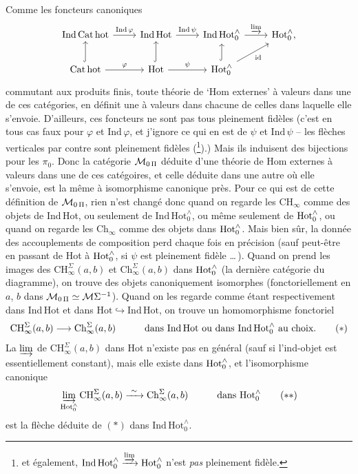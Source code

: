 Comme les foncteurs canoniques
\[
\begin{tikzcd}
\mathrm{Ind\,Cat\,hot} \arrow[r, "\mathrm{Ind}\,\varphi"] & \mathrm{Ind\,Hot} \arrow[r, "\mathrm{Ind}\,\psi"] & \mathrm{Ind\,Hot}_0^{\wedge} \arrow[r, "\varinjlim"] & \mathrm{Hot}_0^{\wedge},\\
\mathrm{Cat\,hot} \arrow[u, hook] \arrow[r, "\varphi"] & \mathrm{Hot} \arrow[u, hook] \arrow[r, "\psi"] & \mathrm{Hot}_0^{\wedge} \arrow[u, hook] \arrow[ur, "\mathrm{id}"'] &
\end{tikzcd}
\]
commutant aux produits finis, toute théorie de `Hom externes' à valeurs dans une de ces catégories, en définit une à valeurs dans chacune de celles dans laquelle elle s'envoie.
D'ailleurs, ces foncteurs ne sont pas tous pleinement fidèles (c'est en tous cas faux pour $\varphi$ et $\mathrm{Ind}\,\varphi$, et j'ignore ce qui en est de $\psi$ et $\mathrm{Ind}\,\psi$ -- les flèches verticales par contre sont pleinement fidèles (\footnote[3]{et également, $\mathrm{Ind\,Hot}_0^{\wedge}\xrightarrow{\varinjlim}\mathrm{Hot}_0^{\wedge}$ n'est \textit{pas} pleinement fidèle.}).) Mais ils induisent des bijections pour les $\pi_0$. Donc la catégorie $\mathcal{M}_{0\,\Pi}$ déduite d'une théorie de Hom externes à valeurs dans une de ces catégoires, et celle %
déduite dans une autre où elle s'envoie, est la même à isomorphisme canonique près. Pour ce qui est de cette définition de $\mathcal{M}_{0\,\Pi}$, rien n'est changé donc quand on regarde les $\mathrm{CH}_{\infty}$ comme des objets de Ind\,Hot, ou seulement de $\mathrm{Ind\,Hot}_0^{\wedge}$, ou même seulement de $\mathrm{Hot}_0^{\wedge}$, ou quand on regarde les $\mathrm{Ch}_{\infty}$ comme des objets
dans $\mathrm{Hot}_0^{\wedge}$. Mais bien sûr, la donnée des accouplements de composition perd chaque fois en précision (sauf peut-être en passant de Hot à $\mathrm{Hot}_0^{\wedge}$, si $\psi$ est pleinement fidèle \dots\,). Quand on prend les images des $\mathrm{CH}^{\Sigma}_{\infty}(a,b)$ et $\mathrm{Ch}^{\Sigma}_{\infty}(a,b)$ dans $\mathrm{Hot}_0^{\wedge}$ (la dernière catégorie du diagramme), on trouve des objets canoniquement isomorphes (fonctoriellement en $a$, $b$ dans $\mathcal{M}_{0\,\Pi}\simeq\mathcal{M}\Sigma^{-1}$). Quand on les regarde comme étant respectivement dans Ind\,Hot et dans $\mathrm{Hot}\hookrightarrow\mathrm{Ind\,Hot}$, on trouve un homomorphisme fonctoriel
\[
\mathrm{CH}^{\Sigma}_{\infty}(a,b)\longrightarrow\mathrm{Ch}^{\Sigma}_{\infty}(a,b) \qquad\quad \text{dans Ind\,Hot ou dans } \mathrm{Ind\,Hot}_0^{\wedge} \text{ au choix.} \tag*{$(*)$}
\]
La $\varinjlim$ de $\mathrm{CH}^{\Sigma}_{\infty}(a,b)$ dans Hot n'existe pas en général (sauf si l'ind-objet est essentiellement constant), mais elle existe dans $\mathrm{Hot}_0^{\wedge}$, et l'isomorphisme canonique
\[
\varinjlim_{\HotO}\mathrm{CH}^{\Sigma}_{\infty}(a,b)\xrightarrow{\ \sim\ }\mathrm{Ch}^{\Sigma}_{\infty}(a,b) \qquad\quad \text{dans } \HotO \tag*{$(**)$}
\]
est la flèche déduite de $(*)$ dans $\mathrm{Ind\,Hot}_0^{\wedge}$.

